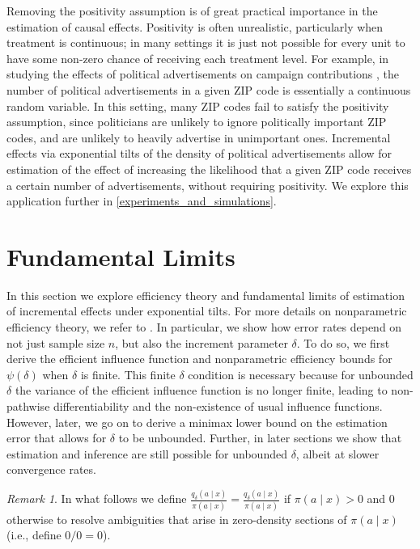 \documentclass[11pt,twoside]{article}
\theoremstyle{definition}
\theoremstyle{remark}
\newtheorem{remark}{Remark}
\begin{document}
Removing the positivity assumption is of great practical importance in the estimation of causal effects. Positivity is often unrealistic, particularly when treatment is continuous; in many settings it is just not possible for every unit to have some non-zero chance of receiving each treatment level. For example, in studying the effects of political advertisements on campaign contributions \citep{urban2014dollars, fong2018covariate}, the number of political advertisements in a given ZIP code is essentially a continuous random variable. In this setting,  many ZIP codes fail to satisfy the positivity assumption, since politicians are unlikely to ignore politically important ZIP codes, and are unlikely to heavily advertise in unimportant ones. Incremental effects via exponential tilts of the density of political advertisements allow for estimation of the effect of increasing the likelihood that a given ZIP code receives a certain number of advertisements, without requiring positivity. We explore this application further in \cref{experiments_and_simulations}.

\section{Fundamental Limits} \label{efficiency_theory_section}

In this section we explore efficiency theory and fundamental limits of estimation of incremental effects under exponential tilts. For more details on nonparametric efficiency theory, we refer to \cite{bickel1993efficient, laan2003unified,  van2002semiparametric, tsiatis2006semiparametric, kosorok2008introduction, kennedy2023semiparametric}.  In particular, we show how error rates depend on not just sample size $n$, but also the increment parameter $\delta$. To do so, we first derive the efficient influence function and nonparametric efficiency bounds for $\psi(\delta)$ when $\delta$ is finite. This finite $\delta$ condition is necessary because for unbounded $\delta$ the variance of the efficient influence function is no longer finite, leading to non-pathwise differentiability and the non-existence of usual influence functions. However, later, we go on to derive a minimax lower bound on the estimation error that allows for $\delta$ to be unbounded. Further, in later sections we show that estimation and inference are still possible for unbounded $\delta$, albeit at slower convergence rates.

\begin{remark}
In what follows we define $\frac{q_\delta(a \mid x)}{\pi(a \mid x)} = \frac{q_\delta(a \mid x)}{\pi(a \mid x)}$ if $\pi(a \mid x) > 0$ and $0$ otherwise to resolve ambiguities that arise in zero-density sections of $\pi(a \mid x)$ (i.e., define $0/0=0$). 
\end{remark}
\end{document}
